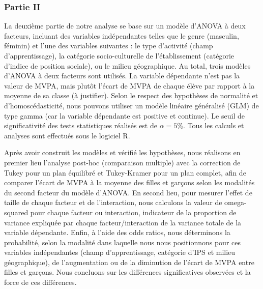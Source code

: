 \documentclass[12pt,a4paper]{article}
\begin{document}
	\subsubsection{Partie II}
	La deuxième partie de notre analyse se base sur un modèle d'ANOVA à deux facteurs, incluant des variables indépendantes telles que le genre (masculin, féminin) et l'une des variables suivantes : le type d'activité (champ d'apprentissage), la catégorie socio-culturelle de l'établissement (catégorie d'indice de position sociale), ou le milieu géographique. Au total, trois modèles d'ANOVA à deux facteurs sont utilisés. La variable dépendante n'est pas la valeur de MVPA, mais plutôt l'écart de MVPA de chaque élève par rapport à la moyenne de sa classe (à justifier). Selon le respect des hypothèses de normalité et d'homoscédasticité, nous pouvons utiliser un modèle linéaire généralisé (GLM) de type gamma (car la variable dépendante est positive et continue). Le seuil de significativité des tests statistiques réalisés est de $\alpha = 5\%$. Tous les calculs et analyses sont effectués sous le logiciel R.
	
	Après avoir construit les modèles et vérifié les hypothèses, nous réalisons en premier lieu l'analyse post-hoc (comparaison multiple) avec la correction de Tukey pour un plan équilibré et Tukey-Kramer pour un plan complet, afin de comparer l'écart de MVPA à la moyenne des filles et garçons selon les modalités du second facteur du modèle d'ANOVA. En second lieu, pour mesurer l'effet de taille de chaque facteur et de l'interaction, nous calculons la valeur de omega-squared pour chaque facteur ou interaction, indicateur de la proportion de variance expliquée par chaque facteur/interaction de la variance totale de la variable dépendante. Enfin, à l'aide des odds ratios, nous déterminons la probabilité, selon la modalité dans laquelle nous nous positionnons pour ces variables indépendantes (champ d'apprentissage, catégorie d'IPS et milieu géographique), de l'augmentation ou de la diminution de l'écart de MVPA entre filles et garçons. Nous concluons sur les différences significatives observées et la force de ces différences.
	
\end{document}
